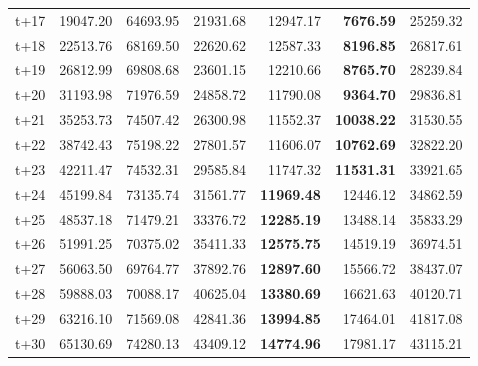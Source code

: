 \begin{table}[H]
\begin{tabular}{lrrrrrr}
t+17  & 19047.20  & 64693.95  & 21931.68  & 12947.17  & \textbf{7676.59}  & 25259.32  \\
t+18  & 22513.76  & 68169.50  & 22620.62  & 12587.33  & \textbf{8196.85}  & 26817.61  \\
t+19  & 26812.99  & 69808.68  & 23601.15  & 12210.66  & \textbf{8765.70}  & 28239.84  \\
t+20  & 31193.98  & 71976.59  & 24858.72  & 11790.08  & \textbf{9364.70}  & 29836.81  \\
t+21  & 35253.73  & 74507.42  & 26300.98  & 11552.37  & \textbf{10038.22}  & 31530.55  \\
t+22  & 38742.43  & 75198.22  & 27801.57  & 11606.07  & \textbf{10762.69}  & 32822.20  \\
t+23  & 42211.47  & 74532.31  & 29585.84  & 11747.32  & \textbf{11531.31}  & 33921.65  \\
t+24  & 45199.84  & 73135.74  & 31561.77  & \textbf{11969.48}  & 12446.12  & 34862.59  \\
t+25  & 48537.18  & 71479.21  & 33376.72  & \textbf{12285.19}  & 13488.14  & 35833.29  \\
t+26  & 51991.25  & 70375.02  & 35411.33  & \textbf{12575.75}  & 14519.19  & 36974.51  \\
t+27  & 56063.50  & 69764.77  & 37892.76  & \textbf{12897.60}  & 15566.72  & 38437.07  \\
t+28  & 59888.03  & 70088.17  & 40625.04  & \textbf{13380.69}  & 16621.63  & 40120.71  \\
t+29  & 63216.10  & 71569.08  & 42841.36  & \textbf{13994.85}  & 17464.01  & 41817.08  \\
t+30  & 65130.69  & 74280.13  & 43409.12  & \textbf{14774.96}  & 17981.17  & 43115.21  \\

\bottomrule
\end{tabular}
\end{table}
